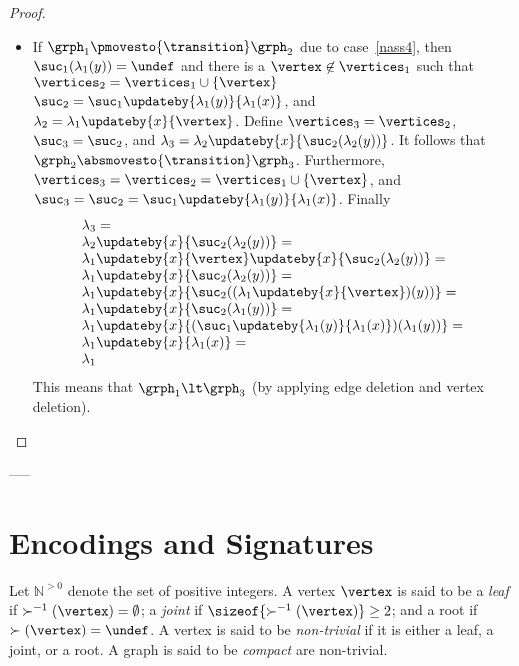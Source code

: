 \begin{proof}
\begin{itemize}
\begin{itemize}
\item
If $\grph_1\pmovesto{\transition}\grph_2$ due to case~\ref{nass4}, then
$\suc_1(\labeling_1(\yvar))=\undef$ and
there is a $\vertex\not\in\vertices_1$ such that
$\vertices_2=\vertices_1\cup\set{\vertex}$ 
$\suc_2=\suc_1\updateby{\labeling_1(\yvar)}{\labeling_1(\xvar)}$, 
and $\labeling_2=\labeling_1\updateby{\xvar}{\vertex}$.
%
Define $\vertices_3=\vertices_2$,
$\suc_3=\suc_2$, and
$\labeling_3=\labeling_2\updateby{\xvar}{\suc_2(\labeling_2(\yvar))}$.
%
It follows that $\grph_2\absmovesto{\transition}\grph_3$.
%
Furthermore, $\vertices_3=\vertices_2=\vertices_1\cup\set{\vertex}$,
and $\suc_3=\suc_2=\suc_1\updateby{\labeling_1(\yvar)}{\labeling_1(\xvar)}$.
%
Finally
\[
\begin{array}{l}
\labeling_3=
\\
\labeling_2\updateby{\xvar}{\suc_2(\labeling_2(\yvar))}=
\\
\labeling_1\updateby{\xvar}{\vertex}\updateby{\xvar}{\suc_2(\labeling_2(\yvar))}=
\\
\labeling_1\updateby{\xvar}{\suc_2(\labeling_2(\yvar))}=
\\
\labeling_1\updateby{\xvar}{\suc_2((\labeling_1\updateby{\xvar}{\vertex})(\yvar))}=
\\
\labeling_1\updateby{\xvar}{\suc_2(\labeling_1(\yvar))}=
\\
\labeling_1\updateby{\xvar}{  (\suc_1\updateby{\labeling_1(\yvar)}{\labeling_1(\xvar)}) (\labeling_1(\yvar))}=
\\
\labeling_1\updateby{\xvar}{\labeling_1(\xvar)}=
\\
\labeling_1
\end{array}
\]
This means that 
$\grph_1\lt\grph_3$ (by applying edge deletion and vertex deletion).

\end{itemize}

\end{itemize}


\end{proof}

-----


\newcommand{\pintgrs}{{\mathbb N}^{>0}}
\newcommand{\encoding}{e}
\newcommand{\cnt}{\#}
\newcommand{\sigof}[1]{{\it sig}\left(#1\right)}


\section{Encodings and Signatures}
\label{encoding:section}
Let $\pintgrs$ denote the set of positive integers.
%
A vertex $\vertex$ is said to be a {\it leaf} if $\succ^{-1}(\vertex)=\emptyset$;
a {\it joint} if  $\sizeof{\succ^{-1}(\vertex)}\geq 2$; and
a root if $\succ(\vertex)=\undef$.
%
A vertex is said to be {\it non-trivial} if it is either a leaf, a joint, or a root.
%
A graph is said to be {\it compact} are non-trivial.
%

